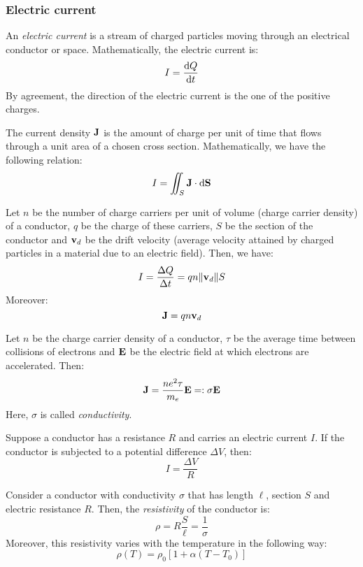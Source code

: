 \documentclass[../../../main.tex]{subfiles}
\begin{document}
\begin{multicols}{2}
    \subsubsection{Electric current}
    \begin{definition}
        An \textit{electric current} is a stream of charged particles moving through an electrical conductor or space. Mathematically, the electric current is: $$I=\dv{Q}{t}$$
        By agreement, the direction of the electric current is the one of the positive charges.
    \end{definition}
    \begin{definition}
        The current density $\boldsymbol{\mathrm{J}}$ is the amount of charge per unit of time that flows through a unit area of a chosen cross section. Mathematically, we have the following relation: $$I=\iint_S\boldsymbol{\mathrm{J}}\cdot\dd \boldsymbol{\mathrm{S}}$$
    \end{definition}
    \begin{prop}
        Let $n$ be the number of charge carriers per unit of volume (charge carrier density) of a conductor, $q$ be the charge of these carriers, $S$ be the section of the conductor and $\boldsymbol{\mathrm{v}}_d$ be the drift velocity (average velocity attained by charged particles in a material due to an electric field). Then, we have:
        $$I=\frac{\Delta Q}{\Delta t}=q n \|\boldsymbol{\mathrm{v}}_d\|S$$
        Moreover: $$\boldsymbol{\mathrm{J}}=q n\boldsymbol{\mathrm{v}}_d$$
    \end{prop}
    \begin{law}
        Let $n$ be the charge carrier density of a conductor, $\tau$ be the average time between collisions of electrons and $\boldsymbol{\mathrm{E}}$ be the electric field at which electrons are accelerated. Then: $$\boldsymbol{\mathrm{J}}=\frac{ne^2\tau}{m_e}\boldsymbol{\mathrm{E}}=:\sigma\boldsymbol{\mathrm{E}}$$
        Here, $\sigma$ is called \textit{conductivity}.
    \end{law}
    \begin{law}
        Suppose a conductor has a resistance $R$ and carries an electric current $I$. If the conductor is subjected to a potential difference $\Delta V$, then: $$I=\frac{\Delta V}{R}$$
    \end{law}
    \begin{definition}[Resistivity]
        Consider a conductor with conductivity $\sigma$ that has length $\ell$, section $S$ and electric resistance $R$. Then, the \textit{resistivity} of the conductor is: $$\rho=R\frac{S}{\ell}=\frac{1}{\sigma}$$
        Moreover, this resistivity varies with the temperature in the following way: $$\rho(T)=\rho_0\left[1+\alpha(T-T_0)\right]$$

\end{definition}
\end{multicols}
\end{document}
